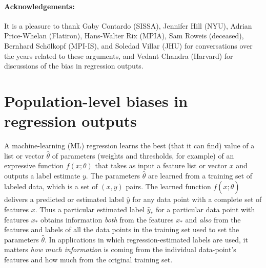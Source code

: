 \documentclass[11pt]{article}
\begin{document}
\paragraph{Acknowledgements:}
It is a pleasure to thank
  Gaby Contardo (SISSA),
  Jennifer Hill (NYU),
  Adrian Price-Whelan (Flatiron),
  Hans-Walter Rix (MPIA),
  Sam Roweis (deceased),
  Bernhard Sch\"olkopf (MPI-IS), and
  Soledad Villar (JHU)
for conversations over the years related to these arguments, and
  Vedant Chandra (Harvard)
for discussions of the bias in regression outputs.

{\raggedright


}

\clearpage\appendix
\section{Population-level biases in regression outputs}\label{app:toy}
A machine-learning (ML) regression learns the best (that it can find) value of a list or vector $\hat{\theta}$ of parameters (weights and thresholds, for example) of an expressive function $f(x;\theta)$ that takes as input a feature list or vector $x$ and outputs a label estimate $y$.
The parameters $\hat{\theta}$ are learned from a training set of labeled data, which is a set of $(x, y)$ pairs.
The learned function $f(x;\hat{\theta})$ delivers a predicted or estimated label $\hat{y}$ for any data point with a complete set of features $x$.
Thus a particular estimated label $\hat{y}_\ast$ for a particular data point with features $x_\ast$ obtains information \emph{both} from the features $x_\ast$ and \emph{also} from the features and labels of all the data points in the training set used to set the parameters $\hat{\theta}$.
In applications in which regression-estimated labels are used, it matters \emph{how much information} is coming from the individual data-point's features and how much from the original training set.
\end{document}
